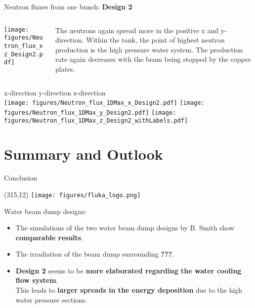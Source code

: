 \documentclass[xcolor={dvipsnames}]{beamer}
\newcommand{\flukalogo}{
  \setlength{\TPHorizModule}{1pt}
  \setlength{\TPVertModule}{1pt}
  \begin{textblock}{1}(315,12)
   \texttt{[image: figures/fluka\_logo.png]}
  \end{textblock}
}
\begin{document}
\begin{frame}{Neutron fluxes from one bunch: \textbf{Design 2}}
\begin{columns}
 \begin{column}{0.5\textwidth}
    \texttt{[image: figures/Neutron\_flux\_xz\_Design2.pdf]}
 \end{column}
 \begin{column}{0.5\textwidth}
  The neutrons again spread more in the positive x and y-direction. Within the tank, the point of highest neutron production is the high pressure water system. The production rate again decreases with the beam being stopped by the copper plates.
 \end{column}
\end{columns}
\hspace*{1cm} x-direction \hfill y-direction \hfill z-direction \hspace*{1cm} \\
  \texttt{[image: figures/Neutron\_flux\_1DMax\_x\_Design2.pdf]}\hfill
  \texttt{[image: figures/Neutron\_flux\_1DMax\_y\_Design2.pdf]}\hfill
  \texttt{[image: figures/Neutron\_flux\_1DMax\_z\_Design2\_withLabels.pdf]}
\end{frame}


\section{Summary and Outlook}
\begin{frame}{Conclusion}
 \flukalogo
 Water beam dump designs:
 \begin{itemize}
  \item The simulations of the two water beam dump designs by B. Smith show \textbf{comparable results}.
  \item The irradiation of the beam dump surrounding \textbf{???}.
  \item \textbf{Design 2} seems to be \textbf{more elaborated regarding the water cooling flow system}.\\
  This leads to \textbf{larger spreads in the energy deposition} due to the high water pressure sections.
 \end{itemize}
\end{frame}
\end{document}
